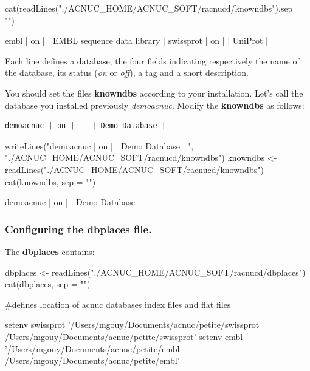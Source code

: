 \documentclass{article}
\begin{document}
\begin{Schunk}
\begin{Sinput}
 cat(readLines("./ACNUC_HOME/ACNUC_SOFT/racnucd/knowndbs"),sep = "\n")
\end{Sinput}
\begin{Soutput}
embl | on |    | EMBL sequence data library | 
swissprot   | on |  | UniProt |
\end{Soutput}
\end{Schunk}

Each line defines a database,  the four fields indicating respectively the name
 of the database, its status  (\textit{on} or \textit{off}), a tag and a short description.
 
You should set the files \textbf{knowndbs}  according to your installation.
Let's call the database you installed previously \textit{demoacnuc}.
Modify  the \textbf{knowndbs} as follows:
\begin{verbatim}
demoacnuc | on |    | Demo Database | 
\end{verbatim}

\begin{Schunk}
\begin{Sinput}
 writeLines("demoacnuc | on |    | Demo Database | ", "./ACNUC_HOME/ACNUC_SOFT/racnucd/knowndbs")
 knowndbs <- readLines("./ACNUC_HOME/ACNUC_SOFT/racnucd/knowndbs")
 cat(knowndbs, sep = "\n")
\end{Sinput}
\begin{Soutput}
demoacnuc | on |    | Demo Database | 
\end{Soutput}
\end{Schunk}

\subsubsection{Configuring the dbplaces file.}


The \textbf{dbplaces} contains:

\begin{Schunk}
\begin{Sinput}
 dbplaces <- readLines("./ACNUC_HOME/ACNUC_SOFT/racnucd/dbplaces")
 cat(dbplaces, sep = "\n")
\end{Sinput}
\begin{Soutput}
#defines location of acnuc databases index files and flat files

setenv 	swissprot 	'/Users/mgouy/Documents/acnuc/petite/swissprot /Users/mgouy/Documents/acnuc/petite/swissprot'
setenv 	embl 	'/Users/mgouy/Documents/acnuc/petite/embl /Users/mgouy/Documents/acnuc/petite/embl'
\end{Soutput}
\end{Schunk}
\end{document}
